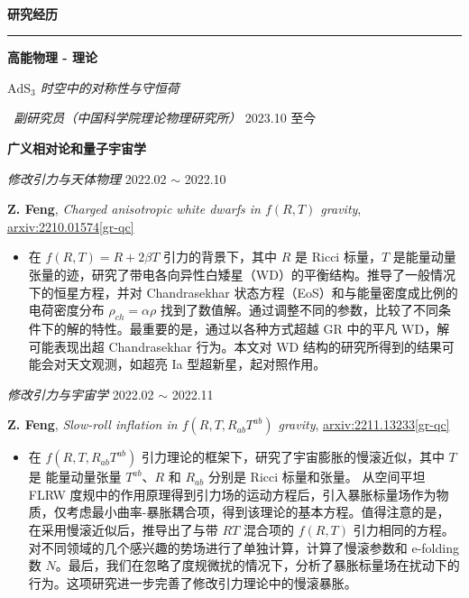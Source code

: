 \documentclass[12pt]{article}
\renewcommand*{\section}[1]{
    ~\\ \noindent \textbf{#1} \medskip \hrule \medskip
}
\begin{document}

\section{研究经历}

\textbf{高能物理 - 理论}

\smallskip \quad \textit{$\mathrm{AdS}_3$ 时空中的对称性与守恒荷}

\hfill \textit{\ 副研究员（中国科学院理论物理研究所）} 2023.10 至今

\textbf{广义相对论和量子宇宙学}

\smallskip \quad \textit{修改引力与天体物理} \hfill 2022.02 $\sim$ 2022.10

\textbf{Z. Feng}, \textit{Charged anisotropic white dwarfs in $f\left({R}, {T}\right)$ gravity}, \href{https://arxiv.org/abs/2210.01574}{arxiv:2210.01574[gr-qc]}

\begin{itemize}
    \item 在 $f\left(R, T\right) = R + 2 \beta T$ 引力的背景下，其中 $R$ 是 Ricci 标量，$T$ 是能量动量张量的迹，研究了带电各向异性白矮星（WD）的平衡结构。推导了一般情况下的恒星方程，并对 Chandrasekhar 状态方程（EoS）和与能量密度成比例的电荷密度分布 $\rho_{ch} = \alpha \rho$ 找到了数值解。通过调整不同的参数，比较了不同条件下的解的特性。最重要的是，通过以各种方式超越 GR 中的平凡 WD，解可能表现出超 Chandrasekhar 行为。本文对 WD 结构的研究所得到的结果可能会对天文观测，如超亮 Ia 型超新星，起对照作用。
\end{itemize}

\smallskip \quad \textit{修改引力与宇宙学} \hfill 2022.02 $\sim$ 2022.11

\textbf{Z. Feng}, \textit{Slow-roll inflation in $f\left(R, T, R_{ab}T^{ab}\right)$ gravity}, \href{https://arxiv.org/abs/2211.13233}{arxiv:2211.13233[gr-qc]}

\begin{itemize}
    \item 在 $f\left(R, T, R_{ab}T^{ab}\right)$ 引力理论的框架下，研究了宇宙膨胀的慢滚近似，其中 $T$ 是 能量动量张量 $T^{ab}$、$R$ 和 $R_{ab}$ 分别是 Ricci 标量和张量。 从空间平坦 FLRW 度规中的作用原理得到引力场的运动方程后，引入暴胀标量场作为物质，仅考虑最小曲率-暴胀耦合项，得到该理论的基本方程。值得注意的是，在采用慢滚近似后，推导出了与带 $RT$ 混合项的 $f(R, T)$ 引力相同的方程。对不同领域的几个感兴趣的势场进行了单独计算，计算了慢滚参数和 e-folding 数 $N$。最后，我们在忽略了度规微扰的情况下，分析了暴胀标量场在扰动下的行为。这项研究进一步完善了修改引力理论中的慢滚暴胀。
\end{itemize}
\end{document}
